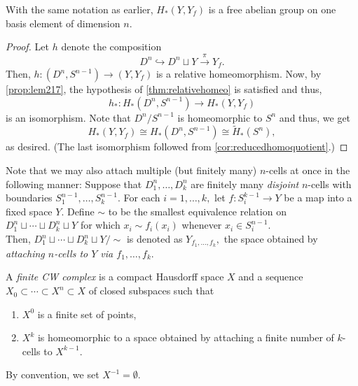 \documentclass[12pt]{article}
\begin{document}
\begin{cor}
	With the same notation as earlier, $H_*(Y, Y_f)$ is a free abelian group on one basis element of dimension $n.$
\end{cor}
\begin{proof} 
	Let $h$ denote the composition
	\begin{equation*} 
		D^n \hookrightarrow D^n \sqcup Y \overset{\pi}{\longrightarrow} Y_f.
	\end{equation*}
	Then, $h:(D^n, S^{n-1})\to (Y, Y_f)$ is a relative homeomorphism. Now, by \cref{prop:lem217}, the hypothesis of \cref{thm:relativehomeo} is satisfied and thus,
	\begin{equation*} 
		h_*:H_*(D^n, S^{n-1}) \to H_*(Y, Y_f)
	\end{equation*}
	is an isomorphism. Note that $D^n/S^{n-1}$ is homeomorphic to $S^n$ and thus, we get
	\begin{equation*} 
		H_*(Y, Y_f) \cong H_*(D^n, S^{n-1}) \cong \widetilde{H}_*(S^n),
	\end{equation*}
	as desired. (The last isomorphism followed from \cref{cor:reducedhomoquotient}.)
\end{proof}

Note that we may also attach multiple (but finitely many) $n$-cells at once in the following manner: Suppose that $D_1^n, \ldots, D_k^n$ are finitely many \emph{disjoint} $n$-cells with boundaries $S_1^{n-1}, \ldots, S_k^{n-1}.$ For each $i = 1, \ldots, k,$ let $f:S_i^{k-1} \to Y$ be a map into a fixed space $Y.$ Define $\sim$ to be the smallest equivalence relation on $D_1^n \sqcup \cdots \sqcup D_k^n \sqcup Y$ for which $x_i \sim f_i(x_i)$ whenever $x_i \in S_i^{n-1}.$\\
Then, $D_1^n \sqcup \cdots \sqcup D_k^n \sqcup Y/{\sim}$ is denoted as $Y_{f_1, \ldots, f_k},$ the space obtained by \emph{attaching $n$-cells to $Y$ via $f_1, \ldots, f_k.$}

\begin{defn} \label{def:finitecwcomplex}
	A \emph{finite CW complex} is a compact Hausdorff space $X$ and a sequence $X_0 \subset \cdots \subset X^n \subset X$ of closed subspaces such that
	\begin{enumerate}
		\item $X^0$ is a finite set of points,
		\item $X^k$ is homeomorphic to a space obtained by attaching a finite number of $k$-cells to $X^{k-1}.$
	\end{enumerate}
\end{defn}
By convention, we set $X^{-1} = \emptyset.$
\end{document}
